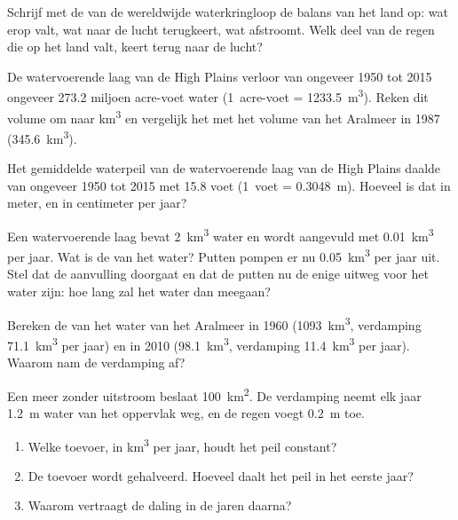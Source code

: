 \begin{exercise}[$\star\star$]\label{exo:g10:freshwater-resources:8}
Schrijf met de  van de wereldwijde waterkringloop de balans van het land op:
wat erop valt, wat naar de lucht terugkeert, wat afstroomt. Welk deel van de regen
die op het land valt, keert terug naar de lucht?
\end{exercise}

\begin{exercise}[$\star\star$]\label{exo:g10:freshwater-resources:9}
De watervoerende laag van de High Plains verloor van ongeveer 1950 tot 2015
ongeveer \num{273.2} miljoen acre-voet water (\num{1}~acre-voet = \qty{1233.5}{m^3}).
Reken dit volume om naar \unit{km^3} en vergelijk het met het volume van het
Aralmeer in 1987 (\qty{345.6}{km^3}).
\end{exercise}

\begin{exercise}[$\star\star$]\label{exo:g10:freshwater-resources:10}
Het gemiddelde waterpeil van de watervoerende laag van de High Plains daalde van
ongeveer 1950 tot 2015 met \num{15.8} voet (\num{1}~voet = \qty{0.3048}{m}).
Hoeveel is dat in meter, en in centimeter per jaar?
\end{exercise}

\begin{exercise}[$\star\star$]\label{exo:g10:freshwater-resources:11}
Een watervoerende laag bevat \qty{2}{km^3} water en wordt aangevuld met
\qty{0.01}{km^3} per jaar. Wat is de  van het water? Putten pompen er
nu \qty{0.05}{km^3} per jaar uit. Stel dat de aanvulling doorgaat en dat de
putten nu de enige uitweg voor het water zijn: hoe lang zal het water dan
meegaan?
\end{exercise}

\begin{exercise}[$\star\star\star$]\label{exo:g10:freshwater-resources:12}
Bereken de  van het water van het Aralmeer in 1960
(\qty{1093}{km^3}, verdamping \qty{71.1}{km^3} per jaar) en in 2010
(\qty{98.1}{km^3}, verdamping \qty{11.4}{km^3} per jaar). Waarom nam de
verdamping af?
\end{exercise}

\begin{exercise}[$\star\star\star$]\label{exo:g10:freshwater-resources:13}
Een meer zonder uitstroom beslaat \qty{100}{km^2}. De verdamping neemt elk jaar
\qty{1.2}{m} water van het oppervlak weg, en de regen voegt \qty{0.2}{m} toe.
\begin{enumerate}
  \item Welke toevoer, in \unit{km^3} per jaar, houdt het peil constant?
  \item De toevoer wordt gehalveerd. Hoeveel daalt het peil in het eerste
        jaar?
  \item Waarom vertraagt de daling in de jaren daarna?
\end{enumerate}
\end{exercise}

